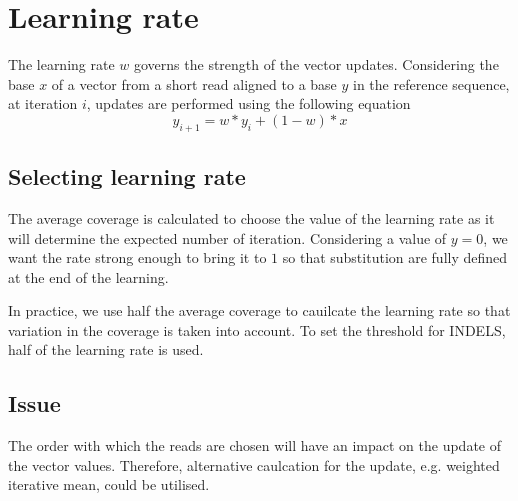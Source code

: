 \documentclass[12pt]{article}\usepackage[]{graphicx}\usepackage[]{color}
\begin{document}
\section{Learning rate}

The learning rate $w$ governs the strength of the vector updates.
Considering the base $x$ of a vector from a short read aligned to a base $y$ in the reference sequence, at iteration $i$, updates are performed using the following equation
\begin{equation}
y_{i+1}=w*y_{i}+(1-w)*x
\end{equation}


\subsection{Selecting learning rate}
The average coverage is calculated to choose the value of the learning rate as it will determine the expected number of iteration.
Considering a value of $y=0$, we want the rate strong enough to bring it to $1$ so that substitution are fully defined at the end of the learning.

In practice, we use half the average coverage to cauilcate the learning rate so that variation in the coverage is taken into account.
To set the threshold for INDELS, half of the learning rate is used.


\subsection{Issue}
The order with which the reads are chosen will have an impact on the update of the vector values.
Therefore, alternative caulcation for the update, e.g. weighted iterative mean, could be utilised.
\end{document}
